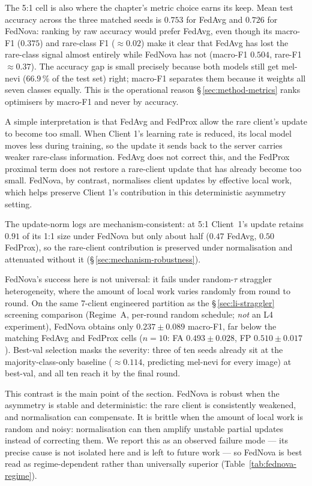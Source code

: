 \documentclass[11pt,a4paper]{report}
\begin{document}
The 5:1 cell is also where the chapter's metric choice earns its keep. Mean
test accuracy across the three matched seeds is $0.753$ for FedAvg and
$0.726$ for FedNova: ranking by raw accuracy would prefer FedAvg, even
though its macro-F1 ($0.375$) and rare-class F1 ($\approx 0.02$) make it
clear that FedAvg has lost the rare-class signal almost entirely while
FedNova has not (macro-F1 $0.504$, rare-F1 $\approx 0.37$). The accuracy
gap is small precisely because both models still get mel-nevi
($66.9\,\%$ of the test set) right; macro-F1 separates them because it
weights all seven classes equally. This is the operational reason \S\,\ref{sec:method-metrics}
ranks optimisers by macro-F1 and never by accuracy.

A simple interpretation is that FedAvg and FedProx allow the rare client's
update to become too small. When Client 1's learning rate is reduced, its
local model moves less during training, so the update it sends back to the
server carries weaker rare-class information. FedAvg does not correct this,
and the FedProx proximal term does not restore a rare-client update that has
already become too small. FedNova, by contrast, normalises client updates by
effective local work, which helps preserve Client 1's contribution in this
deterministic asymmetry setting.

The update-norm logs are mechanism-consistent: at 5:1 Client~1's update retains
$0.91$ of its 1:1 size under FedNova but only about half ($0.47$ FedAvg, $0.50$
FedProx), so the rare-client contribution is preserved under normalisation and
attenuated without it (\S\,\ref{sec:mechanism-robustness}).

FedNova's success here is not universal: it fails under random-$\tau$ straggler
heterogeneity, where the amount of local work varies randomly from round to
round. On the same 7-client engineered partition as the
\S\,\ref{sec:li-straggler} screening comparison (Regime~A, per-round random
schedule; \emph{not} an L4 experiment), FedNova obtains only
$0.237 \pm 0.089$ macro-F1, far below the matching FedAvg and FedProx cells
($n = 10$: FA $0.493 \pm 0.028$, FP $0.510 \pm 0.017$). Best-val selection masks
the severity: three of ten seeds already sit at the majority-class-only baseline
($\approx 0.114$, predicting mel-nevi for every image) at best-val, and all ten
reach it by the final round.

This contrast is the main point of the section. FedNova is robust when the
asymmetry is stable and deterministic: the rare client is consistently
weakened, and normalisation can compensate. It is brittle when the amount of
local work is random and noisy: normalisation can then amplify unstable
partial updates instead of correcting them. We report this as an observed
failure mode --- its precise cause is not isolated here and is left to future
work --- so FedNova is best read as regime-dependent rather than universally
superior (Table~\ref{tab:fednova-regime}).
\end{document}
